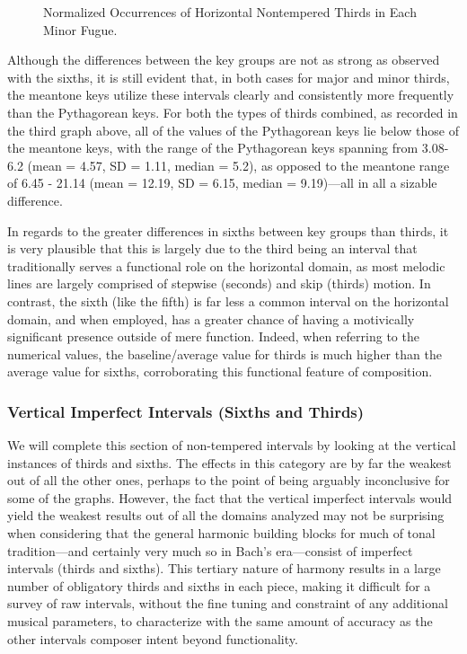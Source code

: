 \begin{figure}[H]
\vspace{1.5em}
    \centering
    \caption{Normalized Occurrences of Horizontal Nontempered Thirds in Each Minor Fugue. }
\end{figure}    Although the differences between the key groups are not as strong as
observed with the sixths, it is still evident that, in both cases for
major and minor thirds, the meantone keys utilize these intervals
clearly and consistently more frequently than the Pythagorean keys. For
both the types of thirds combined, as recorded in the third graph above,
all of the values of the Pythagorean keys lie below those of the
meantone keys, with the range of the Pythagorean keys spanning from
3.08-6.2 (mean = 4.57, SD = 1.11, median = 5.2), as opposed to the
meantone range of 6.45 - 21.14 (mean = 12.19, SD = 6.15, median =
9.19)---all in all a sizable difference.

In regards to the greater differences in sixths between key groups than
thirds, it is very plausible that this is largely due to the third being
an interval that traditionally serves a functional role on the
horizontal domain, as most melodic lines are largely comprised of
stepwise (seconds) and skip (thirds) motion. In contrast, the sixth
(like the fifth) is far less a common interval on the horizontal domain,
and when employed, has a greater chance of having a motivically
significant presence outside of mere function. Indeed, when referring to
the numerical values, the baseline/average value for thirds is much
higher than the average value for sixths, corroborating this functional
feature of composition.

\subsubsection{Vertical Imperfect Intervals (Sixths and
Thirds)}\label{vertical-imperfect-intervals-sixths-and-thirds}

We will complete this section of non-tempered intervals by looking at
the vertical instances of thirds and sixths. The effects in this
category are by far the weakest out of all the other ones, perhaps to
the point of being arguably inconclusive for some of the graphs.
However, the fact that the vertical imperfect intervals would yield the
weakest results out of all the domains analyzed may not be surprising
when considering that the general harmonic building blocks for much of
tonal tradition---and certainly very much so in Bach's
era---consist of imperfect intervals (thirds and sixths). This
tertiary nature of harmony results in a large number of obligatory
thirds and sixths in each piece, making it difficult for a survey of raw
intervals, without the fine tuning and constraint of any additional
musical parameters, to characterize with the same amount of accuracy as
the other intervals composer intent beyond functionality.

